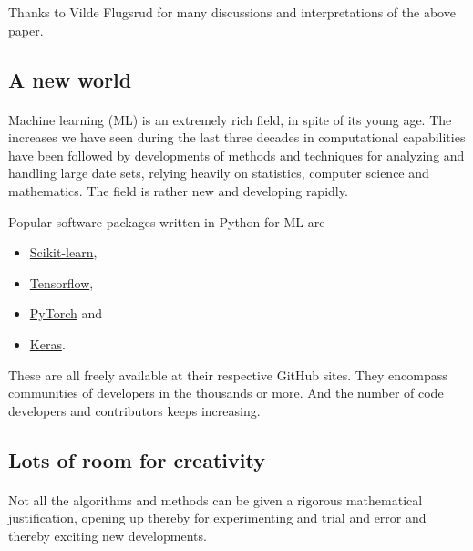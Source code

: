 \documentclass[%
oneside,                 %
final,                   %
10pt]{article}
\begin{document}
Thanks to Vilde Flugsrud for many discussions and interpretations of the above paper.


\subsection{A new world}

\paragraph{}
Machine learning (ML) is an extremely rich field, in spite of its young age. The
increases we have seen during the last three decades in computational
capabilities have been followed by developments of methods and
techniques for analyzing and handling large date sets, relying heavily
on statistics, computer science and mathematics.  The field is rather
new and developing rapidly. 

Popular software packages written in Python for ML are

\begin{itemize}
\item \href{{http://scikit-learn.org/stable/}}{Scikit-learn}, 

\item \href{{https://www.tensorflow.org/}}{Tensorflow},

\item \href{{http://pytorch.org/}}{PyTorch} and 

\item \href{{https://keras.io/}}{Keras}.
\end{itemize}

\noindent
These are all freely available at their respective GitHub sites. They 
encompass communities of developers in the thousands or more. And the number
of code developers and contributors keeps increasing.



\subsection{Lots of room for creativity}

\paragraph{}
Not all the
algorithms and methods can be given a rigorous mathematical
justification, opening up thereby for experimenting
and trial and error and thereby exciting new developments.
\end{document}
